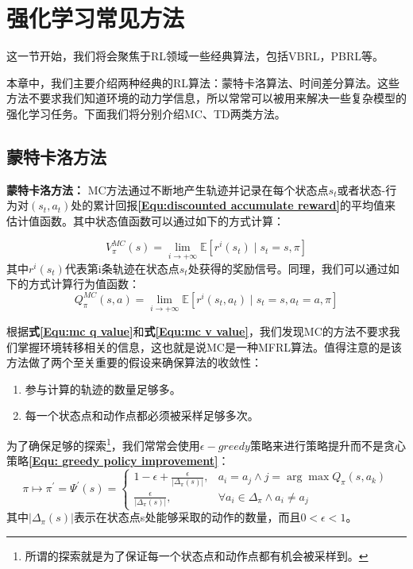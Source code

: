 \section{强化学习常见方法}
这一节开始，我们将会聚焦于RL领域一些经典算法，包括VBRL，PBRL等。

本章中，我们主要介绍两种经典的RL算法：蒙特卡洛算法、时间差分算法。这些方法不要求我们知道环境的动力学信息，所以常常可以被用来解决一些复杂模型的强化学习任务。下面我们将分别介绍MC、TD两类方法。
\label{sec: mc and td method}
\subsection{蒙特卡洛方法}

\textbf{蒙特卡洛方法：} MC方法通过不断地产生轨迹并记录在每个状态点$s_t$或者状态-行为对$(s_t,a_t)$处的累计回报\textbf{\eqref{Equ:discounted accumulate reward}}的平均值来估计值函数。其中状态值函数可以通过如下的方式计算：

\begin{equation}
\label{Equ:mc v value}
    V_{\pi}^{M C}(s)=\lim _{i \rightarrow+\infty} \mathbb{E}\left[r^{i}\left(s_{t}\right) \mid s_{t}=s, \pi\right]
\end{equation}
其中$r^i(s_t)$代表第i条轨迹在状态点$s_t$处获得的奖励信号。同理，我们可以通过如下的方式计算行为值函数：
\begin{equation}
\label{Equ:mc q value}
    Q_{\pi}^{M C}(s, a)=\lim _{i \rightarrow+\infty} \mathbb{E}\left[r^{i}\left(s_{t}, a_{t}\right) \mid s_{t}=s, a_{t}=a, \pi\right]
\end{equation}

根据\textbf{式\eqref{Equ:mc q value}}和\textbf{式\eqref{Equ:mc v value}}，我们发现MC的方法不要求我们掌握环境转移相关的信息，这也就是说MC是一种MFRL算法。值得注意的是该方法做了两个至关重要的假设来确保算法的收敛性：
\begin{enumerate}
    \item 参与计算的轨迹的数量足够多。
    \item 每一个状态点和动作点都必须被采样足够多次。
\end{enumerate}
为了确保足够的探索\footnote{所谓的探索就是为了保证每一个状态点和动作点都有机会被采样到。}，我们常常会使用$\epsilon-greedy$策略来进行策略提升而不是贪心策略\textbf{\eqref{Equ: greedy policy improvement}}：
\begin{equation}
\label{Equ: epsilon-greedy policy improvement}
  \pi \mapsto \pi^{\prime}=\Psi^{\prime}(s)=\left\{\begin{array}{ll}
1-\epsilon+\frac{\epsilon}{\left|\Delta_{\pi}(s)\right|}, & a_{i}=a_{j} \wedge j=\arg \max Q_{\pi}\left(s, a_{k}\right) \\
\frac{\epsilon}{\left|\Delta_{\pi}(s)\right|}, & \forall a_{i} \in \Delta_{\pi} \wedge a_{i} \neq a_{j}
\end{array}\right.
\end{equation}
其中$\left|\Delta_{\pi}(s)\right|$表示在状态点s处能够采取的动作的数量，而且$0<\epsilon<1$。

